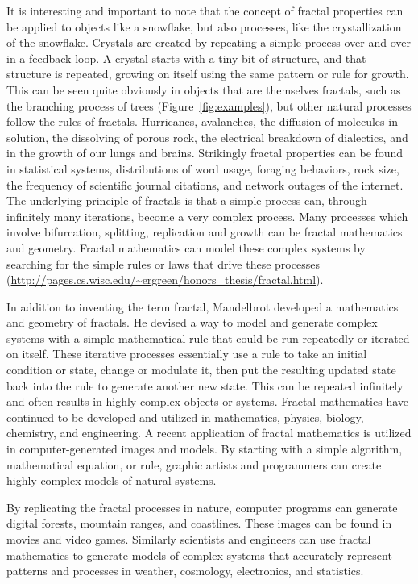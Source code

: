 \documentclass[english,jou]{apa6}
\begin{document}
It is interesting and important to note that the concept of fractal properties can be applied to objects like a snowflake, but also processes, like the crystallization of the snowflake. Crystals are created by repeating a simple process over and over in a feedback loop. A crystal starts with a tiny bit of structure, and that structure is repeated, growing on itself using the same pattern or rule for growth. This can be seen quite obviously in objects that are themselves fractals, such as the branching process of trees (Figure~\ref{fig:examples}), but other natural processes follow the rules of fractals. Hurricanes, avalanches, the diffusion of molecules in solution, the dissolving of porous rock, the electrical breakdown of dialectics, and in the growth of our lungs and brains. Strikingly fractal properties can be found in statistical systems, distributions of word usage, foraging behaviors, rock size, the frequency of scientific journal citations, and network outages of the internet. The underlying principle of fractals is that a simple process can, through infinitely many iterations, become a very complex process. Many processes which involve bifurcation, splitting, replication and growth can be fractal mathematics and geometry. Fractal mathematics can model these complex systems by searching for the simple rules or laws that drive these processes (\url{http://pages.cs.wisc.edu/~ergreen/honors_thesis/fractal.html}).

In addition to inventing the term fractal, Mandelbrot developed a mathematics and geometry of fractals. He devised a way to model and generate complex systems with a simple mathematical rule that could be run repeatedly or iterated on itself. These iterative processes essentially use a rule to take an initial condition or state, change or modulate it, then put the resulting updated state back into the rule to generate another new state. This can be repeated infinitely and often results in highly complex objects or systems. Fractal mathematics have continued to be developed and utilized in mathematics, physics, biology, chemistry, and engineering. A recent application of fractal mathematics is utilized in computer-generated images and models. By starting with a simple algorithm, mathematical equation, or rule, graphic artists and programmers can create highly complex models of natural systems.

By replicating the fractal processes in nature, computer programs can generate digital forests, mountain ranges, and coastlines. These images can be found in movies and video games. Similarly scientists and engineers can use fractal mathematics to generate models of complex systems that accurately represent patterns and processes in weather, cosmology, electronics, and statistics.
\end{document}
